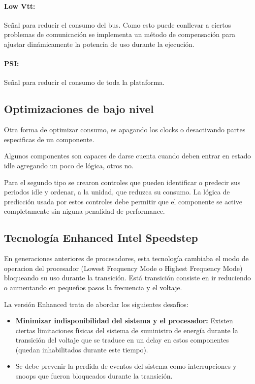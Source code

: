 \paragraph{Low Vtt:} Señal para reducir el consumo del bus. Como esto puede conllevar a ciertos problemas de comunicación se implementa un método de compensación para ajustar dinámicamente la potencia de uso durante la ejecución.

\paragraph{PSI:} Señal para reducir el consumo de toda la plataforma.

\subsection{Optimizaciones de bajo nivel}
Otra forma de optimizar consumo, es apagando los clocks o desactivando partes especificas de un componente.

Algunos componentes son capaces de darse cuenta cuando deben entrar en estado idle agregando un poco de lógica, otros no. 

Para el segundo tipo se crearon controles que pueden identificar o predecir sus periodos idle y ordenar, a la unidad, que reduzca su consumo. La lógica de predicción usada por estos controles debe permitir que el componente se active completamente sin niguna penalidad de performance.

\subsection{Tecnología Enhanced Intel Speedstep}\label{sec::intel::enhancedSpeedStep::enhancedSpeedStep}
En generaciones anteriores de procesadores, esta  tecnología cambiaba el modo de operacion del procesador (Lowest Frequency Mode o Highest Frequency Mode) bloqueando su uso durante la transición. Está transición consiste en ir reduciendo o aumentando en pequeños pasos la frecuencia y el voltaje.

La versión Enhanced trata de abordar los siguientes desafíos:
\begin{itemize}
	\item \textbf{Minimizar indisponibilidad del sistema y el procesador:}  Existen ciertas limitaciones físicas del sistema de suministro de energía durante la transición del voltaje que se traduce en un delay en estos componentes (quedan inhabilitados durante este tiempo).
	\item Se debe prevenir la perdida de eventos del sistema como interrupciones y snoops que fueron bloqueados durante la transición.
\end{itemize}

